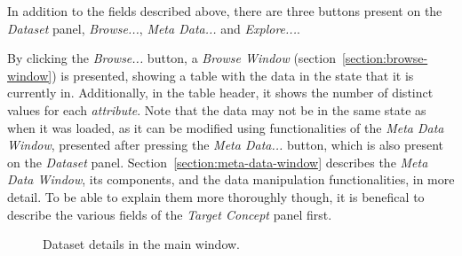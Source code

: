 \documentclass{article}
\begin{document}
In addition to the fields described above, there are three buttons present on the \emph{Dataset} panel, \emph{Browse...}, \emph{Meta Data...} and \emph{Explore...}.

By clicking the \emph{Browse...} button, a \emph{Browse Window} (section~\ref{section:browse-window}) is presented, showing a table with the data in the state that it is currently in.
Additionally, in the table header, it shows the number of distinct values for each \emph{attribute}.
Note that the data may not be in the same state as when it was loaded, as it can be modified using functionalities of the \emph{Meta Data Window}, presented after pressing the \emph{Meta Data...} button, which is also present on the \emph{Dataset} panel.
Section~\ref{section:meta-data-window} describes the \emph{Meta Data Window}, its components, and the data manipulation functionalities, in more detail.
To be able to explain them more thoroughly though, it is benefical to describe the various fields of the \emph{Target Concept} panel first.

\begin{figure}
\begin{center}
\centering
{}
\caption{Dataset details in the main window.}
\end{center}
\label{fig:dataset}
\end{figure}
\end{document}
